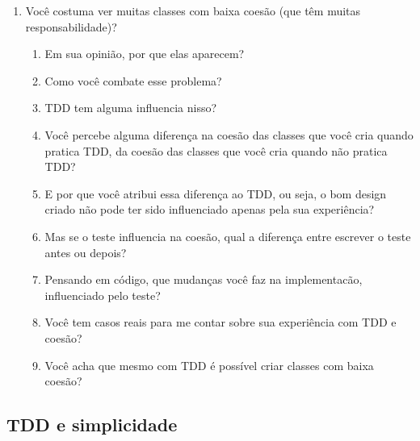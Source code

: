 \begin{enumerate}
	\item{Você costuma ver muitas classes com baixa coesão (que têm muitas responsabilidade)?}
		\begin{enumerate}
			\item Em sua opinião, por que elas aparecem?

			\item Como você combate esse problema?

			\item TDD tem alguma influencia nisso?
			
			\item Você percebe alguma diferença na coesão das classes que você cria quando
			pratica TDD, da coesão das classes que você cria quando não pratica TDD?
			
			\item E por que você atribui essa diferença ao TDD, ou seja, o bom design
			criado não pode ter sido influenciado apenas pela sua experiência?
			
			\item Mas se o teste influencia na coesão, 
			qual a diferença entre escrever o teste antes ou depois?
			
			\item Pensando em código, que mudanças você faz na implementacão, influenciado
			pelo teste?
			
			\item Você tem casos reais para me contar sobre sua experiência com TDD e 
			coesão?

			\item Você acha que mesmo com TDD é possível criar classes com baixa coesão? 

		\end{enumerate}
\end{enumerate}

\subsection{TDD e simplicidade}
\label{entrevista:simplicidade}

